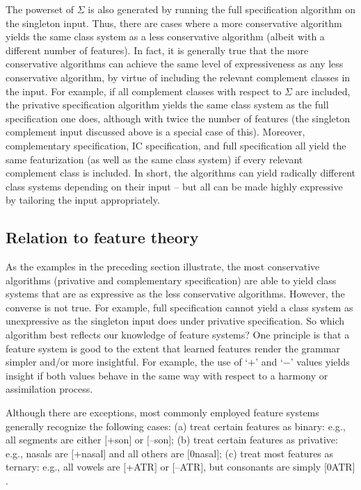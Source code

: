 \documentclass[12pt, oneside]{article}   	%
\newcommand{\featmat}[1]
{$[$#1$]$}
\begin{document}
The powerset of $\Sigma$ is also generated by running the full specification algorithm on the singleton input. Thus, there are cases where a more conservative algorithm yields the same class system as a less conservative algorithm (albeit with a different number of features). In fact, it is generally true that the more conservative algorithms can achieve the same level of expressiveness as any less conservative algorithm, by virtue of including the relevant complement classes in the input. For example, if all complement classes with respect to $\Sigma$ are included, the privative specification algorithm yields the same class system as the full specification one does, although with twice the number of features (the singleton complement input discussed above is a special case of this). Moreover, complementary specification, IC specification, and full specification all yield the same featurization (as well as the same class system) if every relevant complement class is included. In short, the algorithms can yield radically different class systems depending on their input -- but all can be made highly expressive by tailoring the input appropriately.

\subsection{Relation to feature theory}
\label{sec:feature_theory}

As the examples in the preceding section illustrate, the most conservative algorithms (privative and complementary specification) are able to yield class systems that are as expressive as the less conservative algorithms. However, the converse is not true. For example, full specification cannot yield a class system as unexpressive as the singleton input does under privative specification. So which algorithm best reflects our knowledge of feature systems? One principle is that a feature system is good to the extent that learned features render the grammar simpler and/or more insightful. For example, the use of `$+$' and `$-$' values yields insight if both values behave in the same way with respect to a harmony or assimilation process.

Although there are exceptions, most commonly employed feature systems generally recognize the following cases: (a) treat certain features as binary: e.g., all segments are either \featmat{+son} or \featmat{--son}; (b) treat certain features as privative: e.g., nasals are \featmat{+nasal} and all others are \featmat{0nasal}; (c) treat most features as ternary: e.g., all vowels are \featmat{+ATR} or \featmat{--ATR}, but consonants are simply \featmat{0ATR}.
\end{document}
